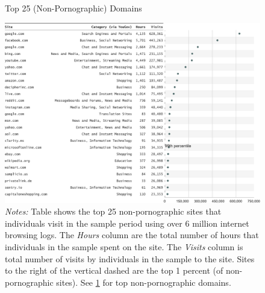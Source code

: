\documentclass[12pt, letterpaper]{article}
\begin{document}
\begin{figure}
	\centering
	\caption{Top 25 (Non-Pornographic) Domains}
	\includegraphics[width=\textwidth]{../figs/top_25_nonadultsites.pdf}
	\caption*{\footnotesize \emph{Notes:} 
		Table shows the top 25 non-pornographic sites that individuals visit in the sample period using over 6 million internet browsing logs.
		The \emph{Hours} column are the total number of hours that individuals in the sample spent on the site. 
		The \emph{Visits} column is total number of visits by individuals in the sample to the site.  			
		Sites to the right of the vertical dashed are the top 1 percent (of non-pornographic sites).
		See \cref{fig:top25_nonadult} for top non-pornographic domains.
	}
	\label{fig:top25_nonadult}
\end{figure}
\end{document}
